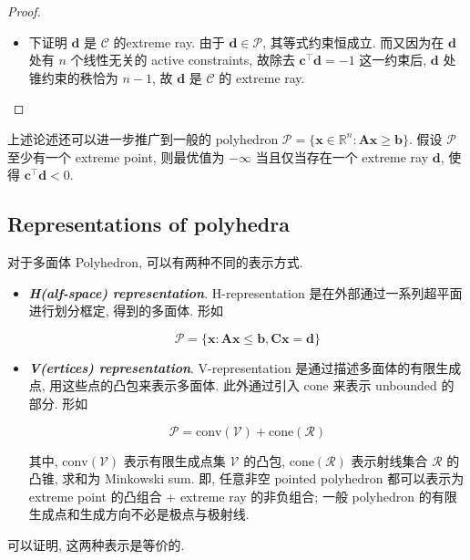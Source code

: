 \begin{thmblock}
\begin{proof}{}
\begin{itemize}
\item {}下证明 $\bm{d}$ 是 $\mathcal{C}$ 的extreme ray. 由于 $\bm{d} \in \mathcal{P}$, 其等式约束恒成立. 而又因为在 $\bm{d}$ 处有 $n$ 个线性无关的 active constraints, 故除去 $\bm{c}^\top \bm{d}=-1$ 这一约束后, $\bm{d}$ 处锥约束的秩恰为 $n-1$, 故 $\bm{d}$ 是 $\mathcal{C}$ 的 extreme ray.


\end{itemize}

\end{proof}

\end{thmblock}


\begin{colblock}{}
上述论述还可以进一步推广到一般的 polyhedron $\mathcal{P} = \{\bm{x} \in \mathbb{R}^n: \bm{A}\bm{x} \geq \bm{b}\}$. 假设 $\mathcal{P}$ 至少有一个 extreme point, 则最优值为 $-\infty$ 当且仅当存在一个 extreme ray $\bm{d}$, 使得 $\bm{c}^\top \bm{d} < 0$.

\end{colblock}

\subsection{Representations of polyhedra}

对于多面体 Polyhedron, 可以有两种不同的表示方式.

\begin{itemize}
\item {}\emph{\textbf{H(alf-space) representation}}. H-representation 是在外部通过一系列超平面进行划分框定, 得到的多面体. 形如

\[
  \mathcal{P} = \{\bm{x}: \bm{A}\bm{x} \leq \bm{b}, \bm{C}\bm{x} = \bm{d}\}
\]


\item {}\emph{\textbf{V(ertices) representation}}. V-representation 是通过描述多面体的有限生成点, 用这些点的凸包来表示多面体. 此外通过引入 cone 来表示 unbounded 的部分. 形如

\[
  \mathcal{P} = \text{conv}(\mathcal{V}) + \text{cone}(\mathcal{R})
\]

其中, $\text{conv}(\mathcal{V})$ 表示有限生成点集 $\mathcal{V}$ 的凸包, $\text{cone}(\mathcal{R})$ 表示射线集合 $\mathcal{R}$ 的凸锥, 求和为 Minkowski sum. 即, 任意非空 pointed polyhedron 都可以表示为 extreme point 的凸组合 + extreme ray 的非负组合; 一般 polyhedron 的有限生成点和生成方向不必是极点与极射线.


\end{itemize}

可以证明, 这两种表示是等价的.

